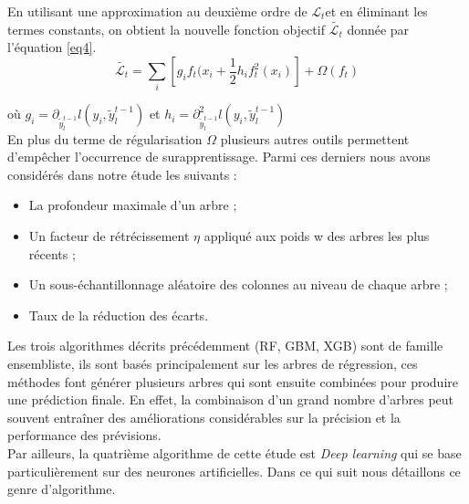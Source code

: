 En utilisant une approximation au deuxième ordre de $\mathcal{L}_t$et en éliminant les termes constants, on obtient la nouvelle fonction objectif $\widetilde{\mathcal{L}_t}$ donnée par l’équation \ref{eq4}.
\begin{equation}\label{eq4}
    \widetilde{\mathcal{L}_t} = \sum_{i}[g_{i}f_{t}(x_{i} + \frac{1}{2} h_{i}f_{t}^2(x_i)] + \Omega (f_t)
\end{equation}

où $ g_i = \partial_{\widetilde{y}_{l}^{t-1}} l(y_{i}, \widetilde{y}_{l}^{t-1}) $ et $ h_i = \partial_{\widetilde{y}_{l}^{t-1}}^2 l(y_{i}, \widetilde{y}_{l}^{t-1}) $\\

En plus du terme de régularisation $\Omega$ plusieurs autres outils permettent d’empêcher l’occurrence de surapprentissage.
Parmi ces derniers nous avons considérés dans notre étude les suivants :
\begin{itemize}
    \item [\textbullet] La profondeur maximale d’un arbre ;
    \item [\textbullet] Un facteur de rétrécissement $\eta$ appliqué aux poids w des arbres les plus récents ;
    \item [\textbullet] Un sous-échantillonnage aléatoire des colonnes au niveau de chaque arbre ;
    \item [\textbullet] Taux de la réduction des écarts.\\
\end{itemize}

Les trois algorithmes décrits précédemment (RF, GBM, XGB) sont de famille ensembliste, ils sont basés principalement sur les arbres de régression, ces méthodes font générer plusieurs arbres qui sont ensuite combinées pour produire une prédiction finale. En effet, la combinaison d'un grand nombre d'arbres peut souvent entraîner des améliorations considérables sur la précision et la performance des prévisions.\\

Par ailleurs, la quatrième algorithme de cette étude est \textit{Deep learning} qui se base particulièrement sur des neurones artificielles. Dans ce qui suit nous détaillons ce genre d'algorithme.  
